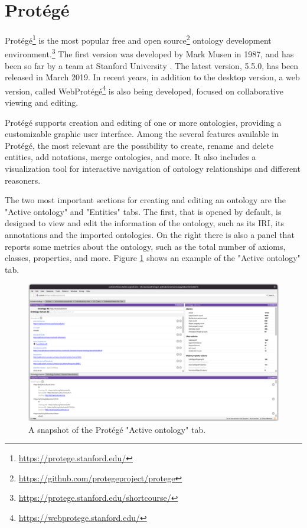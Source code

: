 \section{Protégé}
\label{sec:protege}

Protégé\footnote{\url{https://protege.stanford.edu/}} is the most popular free and open source\footnote{\url{https://github.com/protegeproject/protege}} ontology development environment.\footnote{\url{https://protege.stanford.edu/shortcourse/}} The first version was developed by Mark Musen in 1987, and has been so far by a team at Stanford University \cite{gennari2003evolution}. The latest version, 5.5.0, has been released in March 2019. In recent years, in addition to the desktop version, a web version, called WebProtégé\footnote{\url{https://webprotege.stanford.edu/}} is also being developed, focused on collaborative viewing and editing.

Protégé supports creation and editing of one or more ontologies, providing a customizable graphic user interface. Among the several features available in Protégé, the most relevant are the possibility to create, rename and delete entities, add notations, merge ontologies, and more. It also includes a visualization tool for interactive navigation of ontology relationships and different reasoners.

The two most important sections for creating and editing an ontology are the "Active ontology" and "Entities" tabs. The first, that is opened by default, is designed to view and edit the information of the ontology, such as its \ac{IRI}, its annotations and the imported ontologies. On the right there is also a panel that reports some metrics about the ontology, such as the total number of axioms, classes, properties, and more. Figure \ref{fig:protege-home} shows an example of the "Active ontology" tab.

\begin{figure}[!ht]
  \centering
  \includegraphics[width=\columnwidth]{images/protege/protege-home}
  \caption{A snapshot of the Protégé "Active ontology" tab.}
  \label{fig:protege-home}
\end{figure}


